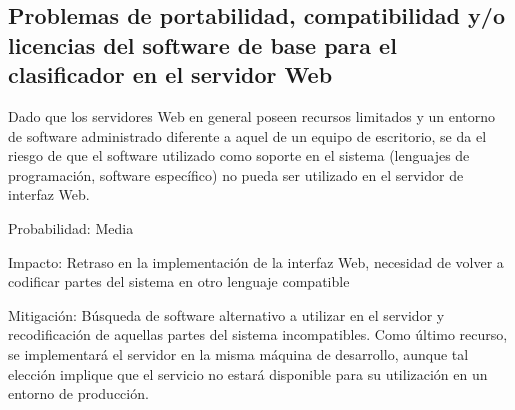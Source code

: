 \documentclass[12pt,bibliography=openstyle,DIV=12,parskip=full-]{scrartcl}
\begin{document}
\subsection{Problemas de portabilidad, compatibilidad y/o
  licencias del software de base para el clasificador en el servidor Web}
Dado que los servidores Web en general poseen recursos limitados y un
entorno de software administrado diferente a aquel de un equipo de
escritorio, se da el riesgo de que el software utilizado como soporte
en el sistema (lenguajes de programación, software específico) no
pueda ser utilizado en el servidor de interfaz Web.
\begin{description*}
  \item[Probabilidad:] Media
  \item[Impacto:] Retraso en la implementación de la interfaz Web,
    necesidad de volver a codificar partes del sistema en otro
    lenguaje compatible
  \item[Mitigación:] Búsqueda de software alternativo a utilizar en el
    servidor y recodificación de aquellas partes del sistema
    incompatibles. Como último recurso, se implementará el servidor en
    la misma máquina de desarrollo, aunque tal elección implique que
    el servicio no estará disponible para su utilización en un entorno
    de producción.
\end{description*}
%
%
\end{document}
